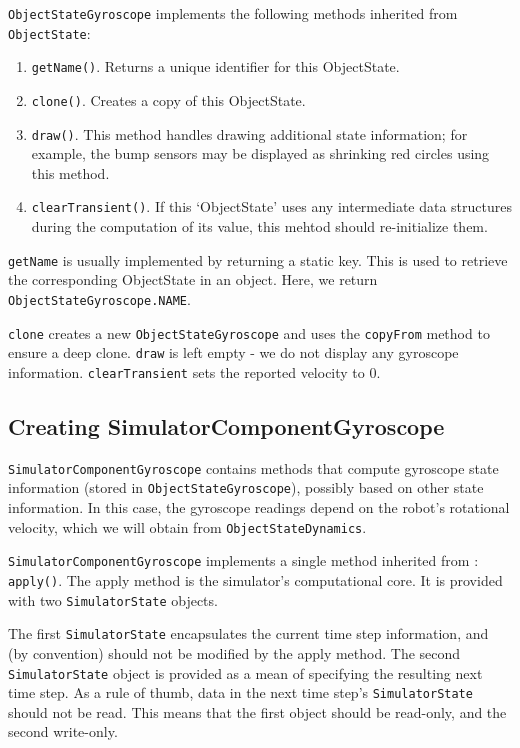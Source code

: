 \documentclass[12pt]{article}
\newcommand{\code}[1]{\texttt{#1}}
\begin{document}
\code{ObjectStateGyroscope} implements the following methods inherited from 
\code{ObjectState}:

\begin{enumerate}
  \item{\code{getName()}. Returns a unique identifier for this ObjectState.}
  \item{\code{clone()}. Creates a copy of this ObjectState.}
  \item{\code{draw()}. This method handles drawing additional state information;
    for example, the bump sensors may be displayed as shrinking red circles
    using this method.}
  \item{\code{clearTransient()}. If this `ObjectState' uses any intermediate
    data structures during the computation of its value, this mehtod should 
    re-initialize them.}
\end{enumerate}

\code{getName} is usually implemented by returning a static key. This is used
to retrieve the corresponding ObjectState in an object.  Here, we return
\code{ObjectStateGyroscope.NAME}.

\code{clone} creates a new \code{ObjectStateGyroscope} and uses the
\code{copyFrom} method to ensure a deep clone.
\code{draw} is left empty - we do not display any gyroscope information.
\code{clearTransient} sets the reported velocity to 0.


\subsection{Creating SimulatorComponentGyroscope}

\code{SimulatorComponentGyroscope} contains methods that compute gyroscope
state information (stored in \code{ObjectStateGyroscope}), possibly based
on other state information. In this case, the gyroscope readings depend on
the robot's rotational velocity, which we will obtain from 
\code{ObjectStateDynamics}.

\code{SimulatorComponentGyroscope} implements a single method inherited from
: \code{apply()}. The apply method is the simulator's
computational core. It is provided with two \code{SimulatorState} objects.

The first \code{SimulatorState} encapsulates the current time step information,
and (by convention) should not be modified by the apply method. The second
\code{SimulatorState} object is provided as a mean of specifying the resulting
next time step. As a rule of thumb, data in the next time step's 
\code{SimulatorState} should not be read. This means that the first object
should be read-only, and the second write-only. 
\end{document}
